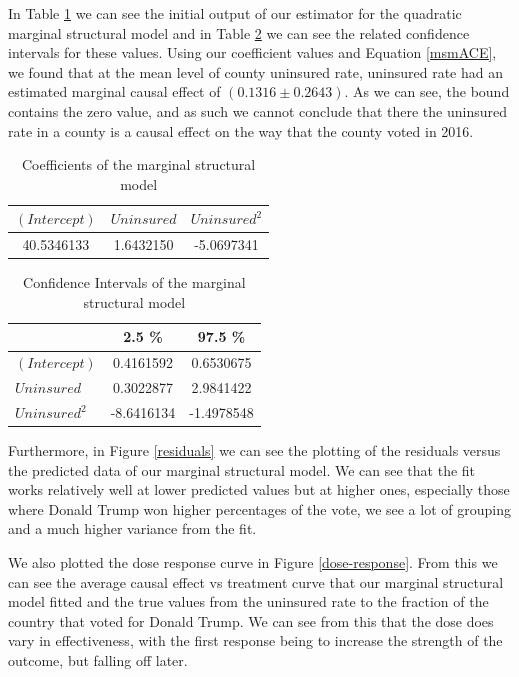 \documentclass[11pt, conference,compsoc]{IEEEtran}
\begin{document}
In Table \ref{msmtable} we can see the initial output of our estimator for the quadratic marginal structural model and in Table \ref{cimsm} we can see the related confidence intervals for these values. Using our coefficient values and Equation \ref{msmACE}, we found that at the mean level of county uninsured rate, uninsured rate had an estimated marginal causal effect of $(0.1316\pm0.2643)$. As we can see, the bound contains the zero value, and as such we cannot conclude that there the uninsured rate in a county is a causal effect on the way that the county voted in 2016.

\begin{table}
\caption{Coefficients of the marginal structural model}
\label{msmtable}
\begin{center}
\begin{tabular}{ |c |c| c |}
\hline
$(Intercept)$&$Uninsured$&$Uninsured^2$\\ \hline
40.5346133 &1.6432150 &-5.0697341  \\ \hline
\end{tabular}
\end{center}
\end{table}

\begin{table}
\begin{center}
\caption{Confidence Intervals of the marginal structural model}
\label{cimsm}
\begin{tabular}{ |l |c| c |}
\hline
& 2.5 \% &97.5 \% \\  \hline
$(Intercept)$&0.4161592&0.6530675 \\ \hline
$Uninsured$&0.3022877&2.9841422 \\ \hline
$Uninsured^2$&-8.6416134&-1.4978548 \\\hline
\end{tabular}
\end{center}
\end{table}

Furthermore, in Figure \ref{residuals} we can see the plotting of the residuals versus the predicted data of our marginal structural model. We can see that the fit works relatively well at lower predicted values but at higher ones, especially those where Donald Trump won higher percentages of the vote, we see a lot of grouping and a much higher variance from the fit.

We also plotted the dose response curve in Figure \ref{dose-response}. From this we can see the average causal effect vs treatment curve that our marginal structural model fitted and the true values from the uninsured rate to the fraction of the country that voted for Donald Trump. We can see from this that the dose does vary in effectiveness, with the first response being to increase the strength of the outcome, but falling off later. 
\end{document}

